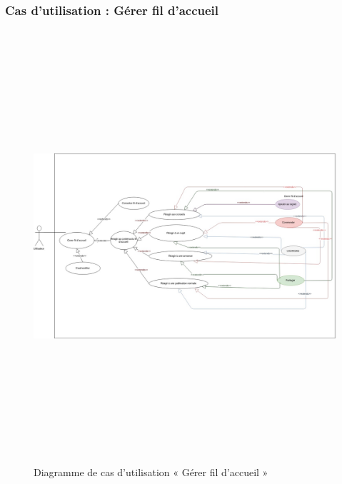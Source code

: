\documentclass[11pt,a4paper,oneside]{book}
\begin{document}
		\subsubsection{Cas d’utilisation : Gérer fil d'accueil }
		\begin{figure}[H]
			\centering
			\includegraphics[width=20cm, height=16cm, angle=90]{Diagrammes/gerer_accueil}
			\caption{ Diagramme de cas d’utilisation « Gérer fil d'accueil »}
			\label{fig:gereraccueil}
		\end{figure}
		
\end{document}
